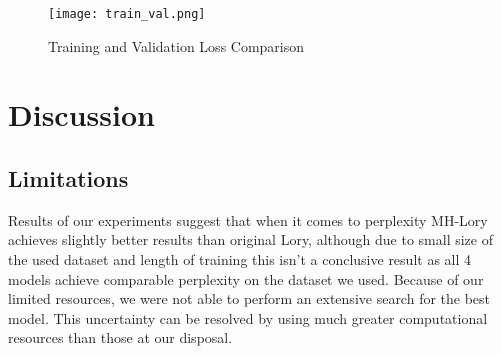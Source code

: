 \documentclass[12pt]{article}
\begin{document}
\begin{figure}[H]
    \centering
    \texttt{[image: train\_val.png]}
    \caption{Training and Validation Loss Comparison}
    \label{fig:train_val_loss}
\end{figure}





\section{Discussion}
\subsection{Limitations}
Results of our experiments suggest that when it comes to perplexity MH-Lory achieves slightly better results than original Lory, although due to small size of the used dataset and length of training this isn't a conclusive result as all 4 models achieve comparable perplexity on the dataset we used. Because of our limited resources, we were not able to perform an extensive search for the best model. This uncertainty can be resolved by using much greater computational resources than those at our disposal.
\end{document}
